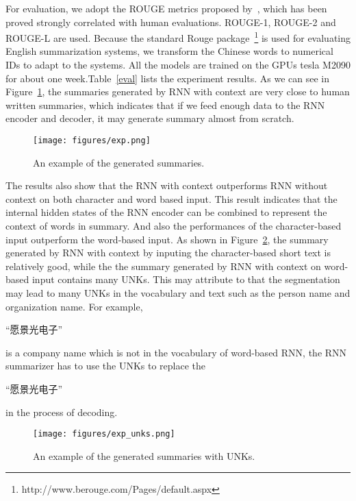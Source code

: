 \documentclass[11pt,a4paper]{article}
\begin{document}
For evaluation, we adopt the ROUGE metrics proposed by~\cite{rouge_2003}, which has been proved strongly correlated with human evaluations. ROUGE-1, ROUGE-2 and ROUGE-L are used. Because the standard Rouge package~\footnote{http://www.berouge.com/Pages/default.aspx} is used for evaluating English summarization systems, we transform the Chinese words to numerical IDs to adapt to the systems. All the models are trained on the GPUs tesla M2090 for about one week.Table~\ref{eval} lists the experiment results. As we can see in Figure~\ref{fig_exp}, the summaries generated by RNN with context are very close to human written summaries, which indicates that if we feed enough data to the RNN encoder and decoder, it may generate summary almost from scratch.

\begin{figure}[!tb]
\centering
\texttt{[image: figures/exp.png]}
\vspace{-25pt}
\caption{An example of the generated summaries.}
\label{fig_exp}
\vspace{-12pt}
\end{figure}

The results also show that the RNN with context outperforms RNN without context on both character and word based input. This result indicates that the internal hidden states of the RNN encoder can be combined to represent the context of words in summary. And also the performances of the character-based input outperform the word-based input.  As shown in Figure~\ref{fig_exp_unks},  the summary generated by RNN with context by inputing the character-based short text is relatively good, while the  the summary generated by RNN with context on word-based input contains many UNKs. This may attribute to that the segmentation may lead to many UNKs in the vocabulary and text such as the person name and organization name. For example,  \begin{CJK}{UTF8}{gkai} ``愿景光电子'' \end{CJK} is a company name which is not in the vocabulary of word-based RNN, the RNN summarizer has to use the UNKs to replace the  \begin{CJK}{UTF8}{gkai} ``愿景光电子'' \end{CJK} in the process of decoding.

\begin{figure}[!tb]
\centering
\texttt{[image: figures/exp\_unks.png]}
\vspace{-25Pt}
\caption{An example of the generated summaries with UNKs.}
\label{fig_exp_unks}
\vspace{-12pt}
\end{figure}
\end{document}
